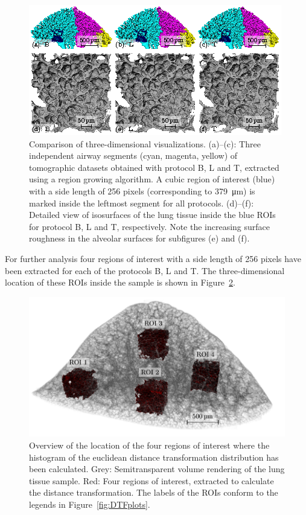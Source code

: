 \begin{figure}[htb]
	\centering
	\includegraphics[width=\linewidth]{img/Haberthuer2010/Fig07-B-L-T}
	\caption[Comparison of three-dimensional visualizations]{Comparison of three-dimensional visualizations. %
			(a)--(c): Three independent airway segments (cyan, magenta, yellow) of tomographic datasets obtained with protocol B, L and T, extracted using a region growing algorithm. A cubic region of interest (blue) with a side length of 256 pixels (corresponding to \SI{379}{\micro\meter}) is marked inside the leftmost segment for all protocols. %
			(d)--(f): Detailed view of isosurfaces of the lung tissue inside the blue ROIs for protocol B, L and T, respectively. Note the increasing surface roughness in the alveolar surfaces for subfigures (e) and (f).}%
	\label{fig:BvsT}
\end{figure}%

For further analysis four regions of interest with a side length of 256 pixels have been extracted for each of the protocols B, L and T. The three-dimensional location of these ROIs inside the sample is shown in Figure~\ref{fig:roi3d}.

\begin{figure}[htb]
	\centering
	\includegraphics[width=\linewidth]{img/Haberthuer2010/Fig08-ROIs}
	\caption[Overview of the location of the four regions of interest in the sample]{Overview of the location of the four regions of interest where the histogram of the euclidean distance transformation distribution has been calculated. Grey: Semitransparent volume rendering of the lung tissue sample. Red: Four regions of interest, extracted to calculate the distance transformation. The labels of the ROIs conform to the legends in Figure~\ref{fig:DTFplots}.}%
	\label{fig:roi3d}
\end{figure}

